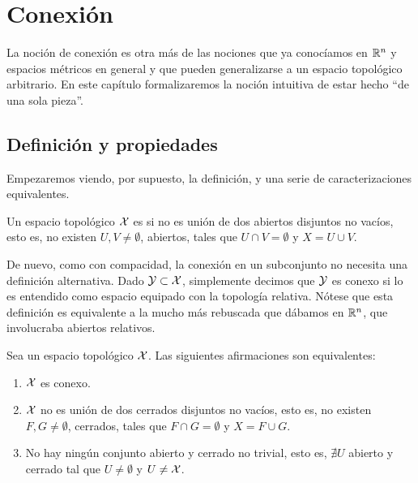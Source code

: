 \chapter{Conexión}
\label{conex}

La noción de conexión es otra más de las nociones que ya conocíamos en $\mathbb{R}^n$ y espacios métricos en general y que pueden generalizarse a un espacio topológico arbitrario. En este capítulo formalizaremos la noción intuitiva de estar hecho ``de una sola pieza''. 

\section{Definición y propiedades}

Empezaremos viendo, por supuesto, la definición, y una serie de caracterizaciones equivalentes.

\begin{defi}[Conexión]
	Un espacio topológico $\mathcal{X}$ es   si no es unión de dos abiertos disjuntos no vacíos, esto es, no existen $U,V\neq\emptyset$, abiertos, tales que $U\cap V=\emptyset$ y $X=U\cup V$.
\end{defi}

\begin{obs}
	De nuevo, como con compacidad, la conexión en un subconjunto no necesita una definición alternativa. Dado $\mathcal{Y}\subset\mathcal{X}$, simplemente decimos que $\mathcal{Y}$ es conexo si lo es entendido como espacio equipado con la topología relativa. Nótese que esta definición es equivalente a la mucho más rebuscada que dábamos en $\mathbb{R}^n$, que involucraba abiertos relativos.
\end{obs}

\begin{prop}
	Sea un espacio topológico $\mathcal{X}$. Las siguientes afirmaciones son equivalentes:
	\begin{enumerate}
		\item $\mathcal{X}$ es conexo.
		\item $\mathcal{X}$ no es unión de dos cerrados disjuntos no vacíos, esto es, no existen $F,G\neq\emptyset$, cerrados, tales que $F\cap G=\emptyset$ y $X=F\cup G$.
		\item No hay ningún conjunto abierto y cerrado no trivial, esto es, $\nexists U$ abierto y cerrado tal que $U\neq\emptyset$ y $U\neq\mathcal{X}$.
	\end{enumerate}
\end{prop}

